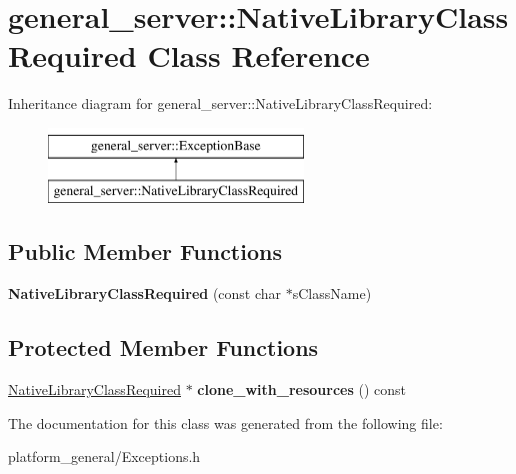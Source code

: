 \hypertarget{classgeneral__server_1_1NativeLibraryClassRequired}{\section{general\-\_\-server\-:\-:\-Native\-Library\-Class\-Required \-Class \-Reference}
\label{classgeneral__server_1_1NativeLibraryClassRequired}
}
\-Inheritance diagram for general\-\_\-server\-:\-:\-Native\-Library\-Class\-Required\-:\begin{figure}[H]
\begin{center}
\leavevmode
\includegraphics[height=2.000000cm]{classgeneral__server_1_1NativeLibraryClassRequired}
\end{center}
\end{figure}
\subsection*{\-Public \-Member \-Functions}
\begin{DoxyCompactItemize}
\item 
\hypertarget{classgeneral__server_1_1NativeLibraryClassRequired_ab47b6a0fd4eb6e1b29533e45ad82f4ca}{{\bfseries \-Native\-Library\-Class\-Required} (const char $\ast$s\-Class\-Name)}\label{classgeneral__server_1_1NativeLibraryClassRequired_ab47b6a0fd4eb6e1b29533e45ad82f4ca}

\end{DoxyCompactItemize}
\subsection*{\-Protected \-Member \-Functions}
\begin{DoxyCompactItemize}
\item 
\hypertarget{classgeneral__server_1_1NativeLibraryClassRequired_a6b0ab35fdeb1eba58e4116f15b8fc05b}{\hyperlink{classgeneral__server_1_1NativeLibraryClassRequired}{\-Native\-Library\-Class\-Required} $\ast$ {\bfseries clone\-\_\-with\-\_\-resources} () const }\label{classgeneral__server_1_1NativeLibraryClassRequired_a6b0ab35fdeb1eba58e4116f15b8fc05b}

\end{DoxyCompactItemize}


\-The documentation for this class was generated from the following file\-:\begin{DoxyCompactItemize}
\item 
platform\-\_\-general/\-Exceptions.\-h\end{DoxyCompactItemize}

